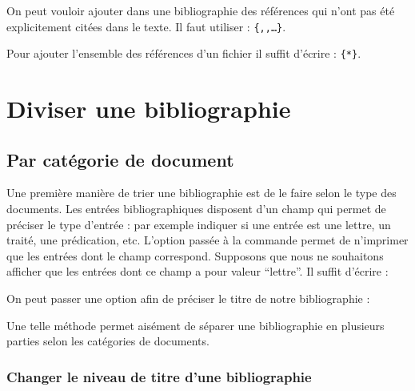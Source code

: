 On peut vouloir ajouter dans une bibliographie des références qui n'ont pas été explicitement citées dans le texte. Il faut  utiliser :
\verb|{|\verb|,|\verb|,…}|.

Pour ajouter l'ensemble des références d'un fichier  il suffit d'écrire : \verb|{*}|.

\section{Diviser une bibliographie}

\subsection{Par catégorie de document}
Une première manière de trier une bibliographie est de le faire selon le type des documents. Les entrées bibliographiques disposent d'un champ  qui permet de préciser le type d'entrée : par exemple indiquer si une entrée est une lettre, un traité, une prédication, etc. L'option  passée à la commande  permet de n'imprimer que les entrées dont le champ  correspond. Supposons que nous ne souhaitons afficher que les entrées dont ce champ  a pour valeur \enquote{lettre}. Il suffit d'écrire :

\begin{latexcode}
\printbibliography[subtype=lettre]
\end{latexcode}

On peut passer une option  afin de préciser le titre de notre bibliographie :

\begin{latexcode}
\printbibliography[subtype=lettre,title=Lettres]
\end{latexcode}

Une telle méthode permet aisément de séparer une bibliographie en plusieurs parties selon les catégories de documents.

\begin{latexcode}
\printbibliography[subtype=concile,title=Actes de concile]
\printbibliography[subtype=traite,title=Traités]
\printbibliography[subtype=lettre,title=Lettres]
\end{latexcode}


\subsubsection{Changer le niveau de titre d'une bibliographie}


